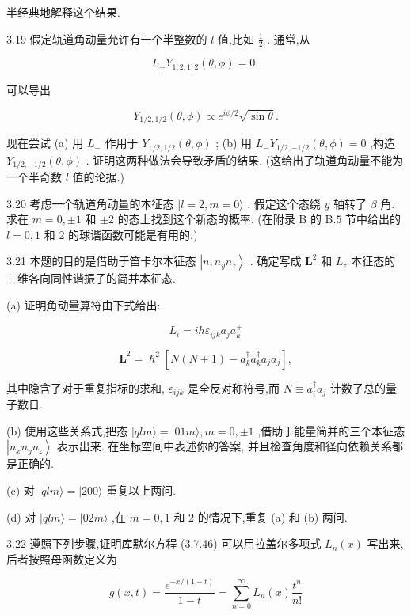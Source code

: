 半经典地解释这个结果.

3.19 假定轨道角动量允许有一个半整数的 $l$ 值,比如 $\frac{1}{2}$ . 通常,从

$$
{L}_{ + }{Y}_{1,2,1,2}\left( {\theta ,\phi }\right) = 0,
$$

可以导出

$$
{Y}_{1/2,1/2}\left( {\theta ,\phi }\right) \propto {e}^{{i\phi }/2}\sqrt{\sin \theta }.
$$

现在尝试 (a) 用 ${L}_{ - }$ 作用于 ${Y}_{1/2,1/2}\left( {\theta ,\phi }\right)$ ; (b) 用 ${L}_{ - }{Y}_{1/2, - 1/2}\left( {\theta ,\phi }\right) = 0$ ,构造 ${Y}_{1/2, - 1/2}\left( {\theta ,\phi }\right)$ . 证明这两种做法会导致矛盾的结果. (这给出了轨道角动量不能为一个半奇数 $l$ 值的论据.)

3.20 考虑一个轨道角动量的本征态 $|l = 2, m = 0\rangle$ . 假定这个态绕 $y$ 轴转了 $\beta$ 角. 求在 $m = 0, \pm 1$ 和 $\pm 2$ 的态上找到这个新态的概率. (在附录 $\mathrm{B}$ 的 $\mathrm{B}{.5}$ 节中给出的 $l = 0,1$ 和 2 的球谐函数可能是有用的.)

3.21 本题的目的是借助于笛卡尔本征态 $\left| {n,{n}_{y}{n}_{z}}\right\rangle$ . 确定写成 ${\mathbf{L}}^{2}$ 和 ${L}_{z}$ 本征态的三维各向同性谐振子的简并本征态.

(a) 证明角动量算符由下式给出:

$$
{L}_{i} = {ih}{\varepsilon }_{ijk}{a}_{j}{a}_{k}^{ + }
$$

$$
{\mathbf{L}}^{2} = {\hslash }^{2}\left\lbrack {N\left( {N + 1}\right) - {a}_{k}^{ \dagger }{a}_{k}^{ \dagger }{a}_{j}{a}_{j}}\right\rbrack ,
$$

其中隐含了对于重复指标的求和, ${\varepsilon }_{ijk}$ 是全反对称符号,而 $N \equiv {a}_{i}^{ \dagger }{a}_{j}$ 计数了总的量子数日.

(b) 使用这些关系式,把态 $\left| {{qlm}\rangle = }\right| {01m}\rangle, m = 0, \pm 1$ ,借助于能量简并的三个本征态 $\left| {{n}_{x}{n}_{y}{n}_{z}}\right\rangle$ 表示出来. 在坐标空间中表述你的答案, 并且检查角度和径向依赖关系都是正确的.

(c) 对 $\left| {{qlm}\rangle = }\right| {200}\rangle$ 重复以上两问.

(d) 对 $\left| {{qlm}\rangle = }\right| {02m}\rangle$ ,在 $m = 0,1$ 和 2 的情况下,重复 (a) 和 (b) 两问.

3.22 遵照下列步骤,证明库默尔方程 (3.7.46) 可以用拉盖尔多项式 ${L}_{n}\left( x\right)$ 写出来,后者按照母函数定义为

$$
g\left( {x, t}\right) = \frac{{e}^{-x/\left( {1 - t}\right) }}{1 - t} = \mathop{\sum }\limits_{{n = 0}}^{\infty }{L}_{n}\left( x\right) \frac{{t}^{n}}{n!}
$$

